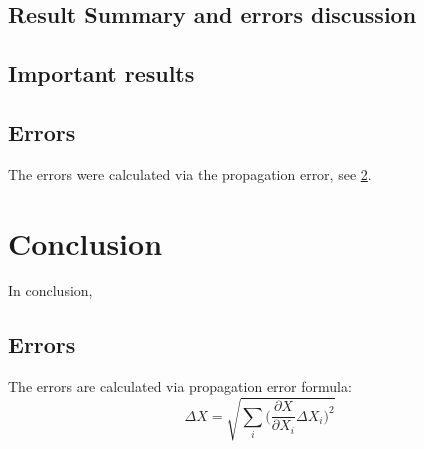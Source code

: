 \documentclass[11pt]{article} %
\begin{document}
\subsection{Result Summary and errors discussion}

\subsection*{Important results}

\subsection*{Errors}

The errors were calculated via the propagation error, see \cref{err}.

\section{Conclusion}

In conclusion,


\printbibliography[heading=bibintoc]
\printnoidxglossaries

\label{last page}



\pagebreak
\newpage

\cfoot{\thepage/\pageref{LastPage}}

\begin{appendices}
	\section{Errors}\label{err}
	The errors are calculated via propagation error formula:
	\begin{equation*}
		 \Delta X=\sqrt{\sum_{i}\Bigg(\frac{\partial X}{\partial X_i}\Delta X_i\Bigg)^2} 
	\end{equation*}
\end{appendices}
\end{document}

